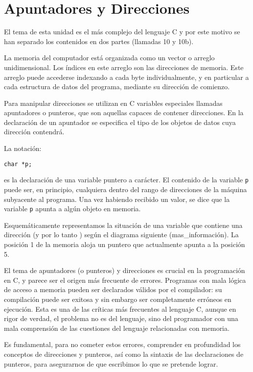 


\chapter{Apuntadores y Direcciones}

El tema de esta unidad es el más complejo del lenguaje C y por este motivo se
han separado los contenidos en dos partes (llamadas 10 y 10b).

La memoria del computador está organizada como un vector o arreglo
unidimensional. Los índices en este arreglo son las direcciones de memoria.
Este arreglo puede accederse indexando a cada byte individualmente, y en
particular a cada estructura de datos del programa, mediante su dirección de
comienzo.

Para manipular direcciones se utilizan en C variables especiales llamadas
apuntadores o punteros, que son aquellas capaces de contener direcciones. En la
declaración de un apuntador se especifica el tipo de los objetos de datos cuya
dirección contendrá.

La notación:
\begin{lstlisting}
char *p;
\end{lstlisting}
es la declaración de una variable puntero a carácter. El contenido de la
variable \lstinline{p} puede ser, en principio, cualquiera dentro del rango de direcciones
de la máquina subyacente al programa. Una vez habiendo recibido un valor, se
dice que la variable \lstinline{p} apunta a algún objeto en memoria.

Esquemáticamente representamos la situación de una variable que contiene una
dirección (y por lo tanto ) según el diagrama siguiente
(mas\_información). La posición 1 de la memoria aloja un puntero que actualmente
apunta a la posición 5.


El tema de apuntadores (o punteros) y direcciones es crucial en la programación
en C, y parece ser el origen más frecuente de errores. Programas con mala
lógica de acceso a memoria pueden ser declarados válidos por el compilador: su
compilación puede ser exitosa y sin embargo ser completamente erróneos en
ejecución. Esta es una de las críticas más frecuentes al lenguaje C, aunque en
rigor de verdad, el problema no es del lenguaje, sino del programador con una
mala comprensión de las cuestiones del lenguaje relacionadas con memoria.

Es fundamental, para no cometer estos errores, comprender en profundidad los
conceptos de direcciones y punteros, así como la sintaxis de las
declaraciones de punteros, para asegurarnos de que escribimos lo que se pretende
lograr.

